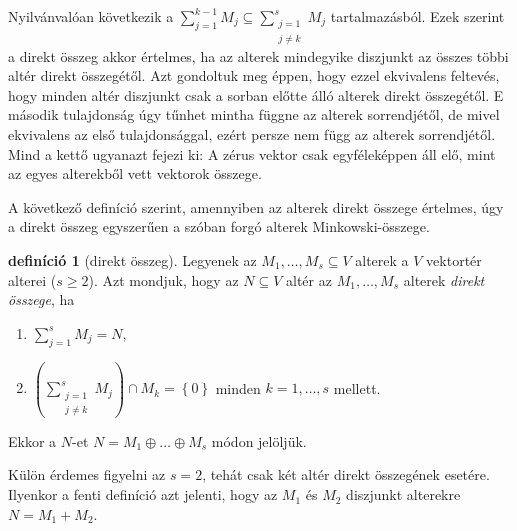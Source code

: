 \documentclass[a4paper, showtrims]{memoir}
\makeatletter
\renewenvironment{proof}[1][\proofname]
    {\par\pushQED{\qed}%
    \normalfont \topsep6\p@\@plus6\p@\relax
    \trivlist
    \item[\hskip\labelsep
        \itshape
    #1\@addpunct{:}]\ignorespaces}
    {\popQED\endtrivlist\@endpefalse}
\theoremstyle{plain}
\theoremstyle{remark}
\theoremstyle{definition}
\newtheorem{definition}[proposition]{definíció}
\makeatother
\begin{document}
\begin{proof}[Végül a $3.\Rightarrow 1.$]
    Nyilvánvalóan következik a
    $\sum_{j=1}^{k-1}M_j
    \subseteq
    \sum_{\substack{j=1\\j\neq k}}^sM_j
    $
    tartalmazásból.
\end{proof}
Ezek szerint a direkt összeg akkor értelmes, ha az alterek mindegyike diszjunkt az összes többi altér direkt összegétől.
Azt gondoltuk meg éppen, hogy ezzel ekvivalens feltevés, 
hogy minden altér diszjunkt csak a sorban előtte álló alterek direkt összegétől.
E második tulajdonság úgy tűnhet mintha függne az alterek sorrendjétől, 
de mivel ekvivalens az első tulajdonsággal,
ezért persze nem függ az alterek sorrendjétől.
Mind a kettő ugyanazt fejezi ki: A zérus vektor csak egyféleképpen áll elő, mint az egyes alterekből vett vektorok összege.

A következő definíció szerint, amennyiben az alterek direkt összege értelmes, úgy a direkt összeg egyszerűen a szóban forgó alterek Minkowski-összege.
\begin{definition}[direkt összeg]
	Legyenek az $M_1,\ldots,M_s\subseteq V$ alterek a $V$ vektortér alterei ($s\geq 2$).
	Azt mondjuk, hogy az $N\subseteq V$ altér az $M_1,\ldots,M_s$ alterek \emph{direkt összege},
	ha
	\begin{enumerate}
		\item $\sum_{j=1}^sM_j=N$,
		\item $\left( \sum_{\substack{j=1\\j\neq k}}^sM_j \right)\cap M_k
			      =
			      \left\{ 0 \right\}$
		      minden $k=1,\ldots,s$ mellett.
	\end{enumerate}
	Ekkor a $N$-et $N=M_1\oplus\dots\oplus M_s$ módon jelöljük.
\end{definition}
Külön érdemes figyelni az $s=2$, tehát csak két altér direkt összegének esetére.
Ilyenkor a fenti definíció azt jelenti,
hogy az $M_1$ és $M_2$ diszjunkt alterekre $N=M_1+M_2$.
\end{document}

